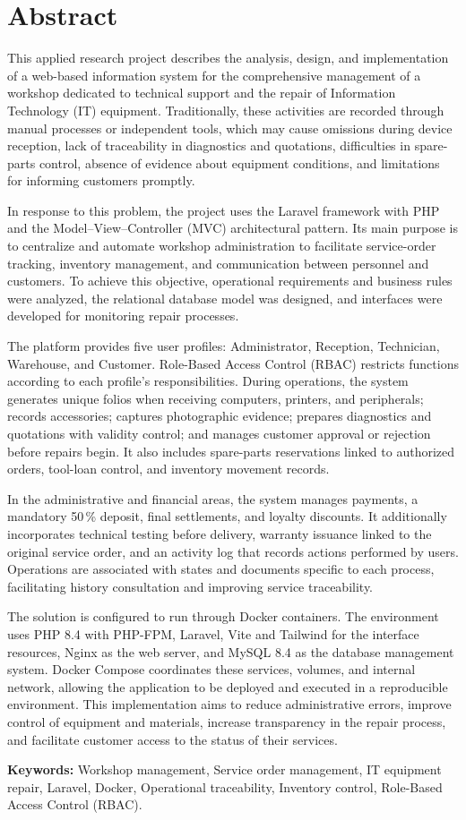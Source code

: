 \section*{Abstract}

This applied research project describes the analysis, design, and implementation of a web-based information system for the comprehensive management of a workshop dedicated to technical support and the repair of Information Technology (IT) equipment. Traditionally, these activities are recorded through manual processes or independent tools, which may cause omissions during device reception, lack of traceability in diagnostics and quotations, difficulties in spare-parts control, absence of evidence about equipment conditions, and limitations for informing customers promptly.

In response to this problem, the project uses the Laravel framework with PHP and the Model--View--Controller (MVC) architectural pattern. Its main purpose is to centralize and automate workshop administration to facilitate service-order tracking, inventory management, and communication between personnel and customers. To achieve this objective, operational requirements and business rules were analyzed, the relational database model was designed, and interfaces were developed for monitoring repair processes.

The platform provides five user profiles: Administrator, Reception, Technician, Warehouse, and Customer. Role-Based Access Control (RBAC) restricts functions according to each profile's responsibilities. During operations, the system generates unique folios when receiving computers, printers, and peripherals; records accessories; captures photographic evidence; prepares diagnostics and quotations with validity control; and manages customer approval or rejection before repairs begin. It also includes spare-parts reservations linked to authorized orders, tool-loan control, and inventory movement records.

In the administrative and financial areas, the system manages payments, a mandatory 50\,\% deposit, final settlements, and loyalty discounts. It additionally incorporates technical testing before delivery, warranty issuance linked to the original service order, and an activity log that records actions performed by users. Operations are associated with states and documents specific to each process, facilitating history consultation and improving service traceability.

The solution is configured to run through Docker containers. The environment uses PHP 8.4 with PHP-FPM, Laravel, Vite and Tailwind for the interface resources, Nginx as the web server, and MySQL 8.4 as the database management system. Docker Compose coordinates these services, volumes, and internal network, allowing the application to be deployed and executed in a reproducible environment. This implementation aims to reduce administrative errors, improve control of equipment and materials, increase transparency in the repair process, and facilitate customer access to the status of their services.

\vspace{0.5cm}
\noindent\textbf{Keywords:} Workshop management, Service order management, IT equipment repair, Laravel, Docker, Operational traceability, Inventory control, Role-Based Access Control (RBAC).
